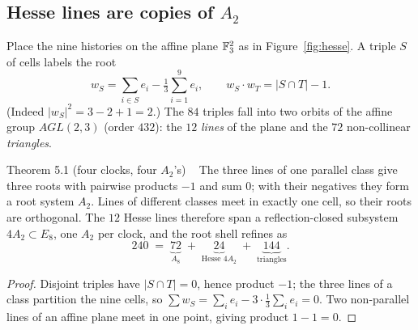 \subsection{Hesse lines are copies of \texorpdfstring{$A_2$}{A2}}

Place the nine histories on the affine plane $\mathbb{F}_3^2$ as in Figure~\ref{fig:hesse}. A
triple $S$ of cells labels the root
\[
w_S=\sum_{i\in S}e_i-\tfrac13\sum_{i=1}^9e_i ,\qquad w_S\cdot w_T=|S\cap T|-1 .
\]
(Indeed $|w_S|^2=3-2+1=2$.) The $84$ triples fall into two orbits of the affine group
$AGL(2,3)$ (order $432$): the $12$ \emph{lines} of the plane and the $72$ non-collinear
\emph{triangles}.

\begin{result}{Theorem 5.1 (four clocks, four $A_2$'s) \hfill \tierT\ \tierC}
The three lines of one parallel class give three roots with pairwise products $-1$ and
sum $0$; with their negatives they form a root system $A_2$. Lines of different classes
meet in exactly one cell, so their roots are orthogonal. The $12$ Hesse lines therefore
span a reflection-closed subsystem $4A_2\subset E_8$, one $A_2$ per clock, and the root
shell refines as
\[
240\;=\;\underbrace{72}_{A_8}\;+\;\underbrace{24}_{\text{Hesse }4A_2}\;+\;\underbrace{144}_{\text{triangles}} .
\]
\end{result}

\begin{proof}
Disjoint triples have $|S\cap T|=0$, hence product $-1$; the three lines of a class
partition the nine cells, so $\sum w_S=\sum_i e_i-3\cdot\frac13\sum_ie_i=0$. Two
non-parallel lines of an affine plane meet in one point, giving product $1-1=0$.
\end{proof}

